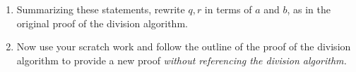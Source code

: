 \documentclass[handout]{ximera}
\begin{document}
\begin{br}
\begin{enumerate}
\begin{enumerate}
\begin{enumerate}
                    \begin{onlineOnly}
                        \begin{hint}
                            The \TeX code for the floor function is \verb|\lfloor ... \rfloor|
                        \end{hint}
                    \end{onlineOnly}
                    as in the proof of the division algorithm. 
  
                    \item When $\inlineAnswer{b<0},$
                    $q=\inlineAnswer{-\floor{\frac{a}{b}}}$ and $r=\inlineAnswer{a-bq}.$
                \end{enumerate}
                
                \item Summarizing these statements, rewrite $q,r$ in terms of $a$ and $b$, as in the original proof of the division algorithm.
            
        
            \item Now use your scratch work and follow the outline of the proof of the division algorithm to provide a new proof \emph{without referencing the division algorithm.}
        
            \pdfOnly{\ifhandout{
                \vfill
                \vfill}
                \else
                \fi}
        \end{enumerate}
    \end{enumerate}
\end{br}
\end{document}
